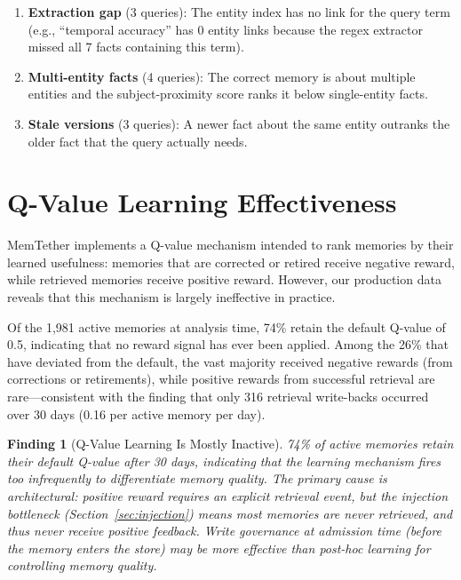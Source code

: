 \documentclass[11pt]{article}
\newtheorem{finding}{Finding}
\begin{document}
\begin{enumerate}
\item \textbf{Extraction gap} (3 queries): The entity index has no link for the query term (e.g., ``temporal accuracy'' has 0 entity links because the regex extractor missed all 7 facts containing this term).
\item \textbf{Multi-entity facts} (4 queries): The correct memory is about multiple entities and the subject-proximity score ranks it below single-entity facts.
\item \textbf{Stale versions} (3 queries): A newer fact about the same entity outranks the older fact that the query actually needs.
\end{enumerate}


\section{Q-Value Learning Effectiveness}
\label{sec:qvalue}

MemTether implements a Q-value mechanism intended to rank memories by their learned usefulness: memories that are corrected or retired receive negative reward, while retrieved memories receive positive reward. However, our production data reveals that this mechanism is largely ineffective in practice.

Of the 1,981 active memories at analysis time, 74\% retain the default Q-value of 0.5, indicating that no reward signal has ever been applied. Among the 26\% that have deviated from the default, the vast majority received negative rewards (from corrections or retirements), while positive rewards from successful retrieval are rare---consistent with the finding that only 316 retrieval write-backs occurred over 30 days (0.16 per active memory per day).

\begin{finding}[Q-Value Learning Is Mostly Inactive]
74\% of active memories retain their default Q-value after 30 days, indicating that the learning mechanism fires too infrequently to differentiate memory quality. The primary cause is architectural: positive reward requires an explicit retrieval event, but the injection bottleneck (Section~\ref{sec:injection}) means most memories are never retrieved, and thus never receive positive feedback. Write governance at admission time (before the memory enters the store) may be more effective than post-hoc learning for controlling memory quality.
\end{finding}
\end{document}
